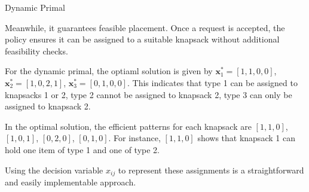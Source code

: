 \begin{algorithm}[H]
    \caption{Dynamic Primal}\label{algo_improve_primal}
\end{algorithm}

Meanwhile, it guarantees feasible placement. Once a request is accepted, the policy ensures it can be assigned to a suitable knapsack without additional feasibility checks.

\begin{example}
For the dynamic primal, the optiaml solution is given by $\bm{x}_{1}^{*} = [1, 1, 0, 0]$, $\bm{x}_{2}^{*} = [1, 0, 2, 1]$, $\bm{x}_{3}^{*} = [0, 1, 0, 0]$. This indicates that type 1 can be assigned to knapsacks 1 or 2, type 2 cannot be assigned to knapsack 2, type 3 can only be assigned to knapsack 2. 

In the optimal solution, the efficient patterns for each knapsack are $[1, 1, 0]$, $[1, 0, 1]$, $[0, 2, 0]$, $[0, 1, 0]$. For instance, $[1, 1, 0]$ shows that knapsack 1 can hold one item of type 1 and one of type 2.

Using the decision variable $x_{ij}$ to represent these assignments is a straightforward and easily implementable approach.
\end{example}





